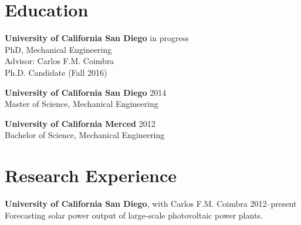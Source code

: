 \documentclass[]{res}
\begin{document}
\address{University of California San Diego \\ 9500 Gilman Drive \#0411 \\ La Jolla, CA 92093--0411}
\address{\hfill \href{mailto:dplarson@ucsd.edu}{dplarson@ucsd.edu} \\
    \hfill \url{http://ieng6.ucsd.edu/~dplarson} \\
    \hfill \url{http://github.com/dplarson}
}


\begin{resume}


\section{Education}
\vspace{0.1in}

\textbf{University of California San Diego} \hfill in progress \\
PhD, Mechanical Engineering \\
Advisor: Carlos F.M. Coimbra \\
Ph.D. Candidate (Fall 2016) \\

\vspace{-0.2in}

\textbf{University of California San Diego} \hfill 2014 \\
Master of Science, Mechanical Engineering \\

\vspace{-0.2in}

\textbf{University of California Merced} \hfill 2012 \\
Bachelor of Science, Mechanical Engineering


\section{Research Experience}
\vspace{0.1in}

\textbf{University of California San Diego}, with Carlos F.M. Coimbra \hfill 2012--present\\
Forecasting solar power output of large-scale photovoltaic power plants.


\end{resume}
\end{document}
